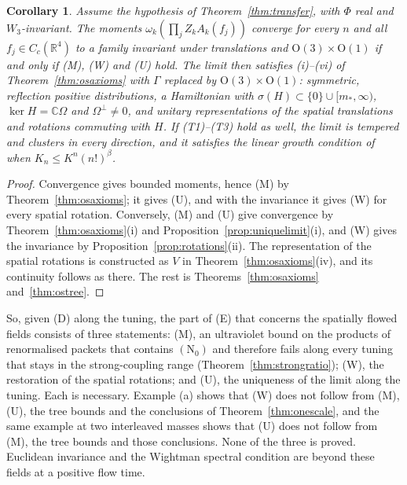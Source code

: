 \documentclass[aps,prd,twocolumn,superscriptaddress,nofootinbib,longbibliography,floatfix,amsmath,amssymb,10pt]{revtex4-2}
\newtheorem{corollary}[theorem]{Corollary}
\theoremstyle{definition}
\theoremstyle{remark}
\newcommand{\R}{\mathbb{R}}
\newcommand{\C}{\mathbb{C}}
\begin{document}
\begin{corollary}\label{cor:osexact}
Assume the hypothesis of Theorem~\textup{\ref{thm:transfer}}, with $\Phi$
real and $W_3$-invariant. The moments $\omega_k(\prod_jZ_kA_k(f_j))$
converge for every $n$ and all $f_j\in C_c(\R^4)$ to a family invariant
under translations and $\mathrm O(3)\times\mathrm O(1)$ if and only if
\textup{(M)}, \textup{(W)} and \textup{(U)} hold. The limit then satisfies
\textup{(i)--(vi)} of Theorem~\textup{\ref{thm:osaxioms}} with $\Gamma$
replaced by $\mathrm O(3)\times\mathrm O(1)$: symmetric, reflection
positive distributions, a Hamiltonian with $\sigma(H)\subset\{0\}\cup
[m_*,\infty)$, $\ker H=\C\Omega$ and $\Omega^\perp\ne0$, and unitary
representations of the spatial translations and rotations commuting with
$H$. If \textup{(T1)--(T3)} hold as well, the limit is tempered and
clusters in every direction, and it satisfies the linear growth condition
of~\cite{OS75} when $K_n\le K^n(n!)^\beta$.
\end{corollary}

\begin{proof}
Convergence gives bounded moments, hence (M) by
Theorem~\ref{thm:osaxioms}; it gives (U), and with the invariance it gives
(W) for every spatial rotation. Conversely, (M) and (U) give convergence by
Theorem~\ref{thm:osaxioms}(i) and Proposition~\ref{prop:uniquelimit}(i),
and (W) gives the invariance by Proposition~\ref{prop:rotations}(ii). The
representation of the spatial rotations is constructed as $V$ in
Theorem~\ref{thm:osaxioms}(iv), and its continuity follows as there. The
rest is Theorems~\ref{thm:osaxioms} and~\ref{thm:ostree}.
\end{proof}

So, given (D) along the tuning, the part of (E) that concerns the spatially
flowed fields consists of three statements: (M), an ultraviolet bound on
the products of renormalised packets that contains $(\mathrm N_0)$ and
therefore fails along every tuning that stays in the strong-coupling range
(Theorem~\ref{thm:strongratio}); (W), the restoration of the spatial
rotations; and (U), the uniqueness of the limit along the tuning. Each is
necessary. Example (a) shows that (W) does not follow from (M), (U), the
tree bounds and the conclusions of Theorem~\ref{thm:onescale}, and the
same example at two interleaved masses shows that (U) does not follow from
(M), the tree bounds and those conclusions. None of the three is proved. Euclidean invariance and the Wightman spectral
condition are beyond these fields at a positive flow time.
\end{document}
